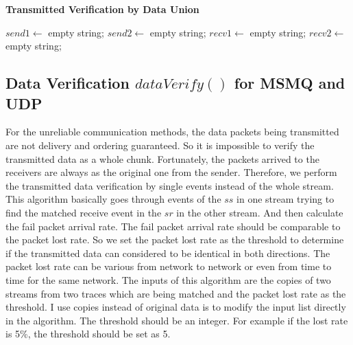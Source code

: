 \begin{algorithm}[H]
\DontPrintSemicolon
\caption{{\bf Transmitted Verification by Data Union} \label{dataAlg1}}
\;
$send1 \leftarrow$ empty string;\;
$send2 \leftarrow$ empty string;\;
$recv1 \leftarrow$ empty string;\;
$recv2 \leftarrow$ empty string;\;

\end{algorithm} 

\subsection{Data Verification $dataVerify()$ for MSMQ and UDP}
For the unreliable communication methods, the data packets being transmitted are not delivery and ordering guaranteed. So it is impossible to verify the transmitted data as a whole chunk. Fortunately, the packets arrived to the receivers are always as the original one from the sender. Therefore, we perform the transmitted data verification by single events instead of the whole stream. This algorithm basically goes through events of the $ss$ in one stream trying to find the matched receive event in the $sr$ in the other stream. And then calculate the fail packet arrival rate. The fail packet arrival rate should be comparable to the packet lost rate. So we set the packet lost rate as the threshold to determine if the transmitted data can considered to be identical in both directions. The packet lost rate can be various from network to network or even from time to time for the same network. The inputs of this algorithm are the copies of two streams from two traces which are being matched and the packet lost rate as the threshold. I use copies instead of original data is to modify the input list directly in the algorithm. The threshold should be an integer. For example if the lost rate is 5\%, the threshold should be set as 5. 

